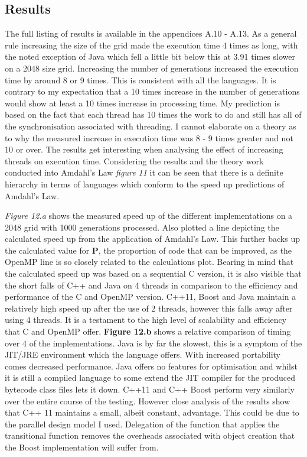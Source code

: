 \documentclass[11pt]{article} %
\begin{document}
\subsection{Results}
The full listing of results is available in the appendices A.10 - A.13. As a general rule increasing the size of the grid made the execution time 4 times as long, with the noted exception of Java which fell a little bit below this at 3.91 times slower on a 2048 size grid. Increasing the number of generations increased the execution time by around 8 or 9 times. This is consistent with all the languages. It is contrary to my expectation that a 10 times increase in the number of generations would show at least a 10 times increase in processing time. My prediction is based on the fact that each thread has 10 times the work to do and still has all of the synchronisation associated with threading. I cannot elaborate on a theory as to why the measured increase in execution time was 8 - 9 times greater and not 10 or over. The results get interesting when analysing the effect of increasing threads on execution time. Considering the results and the theory work conducted into Amdahl's Law {\it figure 11} it can be seen that there is a definite hierarchy in terms of languages which conform to the speed up predictions of Amdahl's Law.

{\it Figure 12.a} shows the measured speed up of the different implementations on a 2048 grid with 1000 generations processed. Also plotted a line depicting the calculated speed up from the application of Amdahl's Law. This further backs up the calculated value for {\bf P}, the proportion of code that can be improved, as the OpenMP line is so closely related to the calculations plot. Bearing in mind that the calculated speed up was based on a sequential C version, it is also visible that the short falls of C++ and Java on 4 threads in comparison to the efficiency and performance of the C and OpenMP version. C++11, Boost and Java maintain a relatively high speed up after the use of 2 threads, however this falls away after using 4 threads. It is a testament to the high level of scalability and efficiency that C and OpenMP offer. {\bf Figure 12.b} shows a relative comparison of timing over 4 of the implementations. Java is by far the slowest, this is a symptom of the JIT/JRE environment which the language offers. With increased portability comes decreased performance. Java offers no features for optimisation and whilst it is still a compiled language to some extend the JIT compiler for the produced bytecode class files lets it down. C++11 and C++ Boost perform very similarly over the entire course of the testing. However close analysis of the results show that C++ 11 maintains a small, albeit constant, advantage. This could be due to the parallel design model I used. Delegation of the function that applies the transitional function removes the overheads associated with object creation that the Boost implementation will suffer from. 
\end{document}
